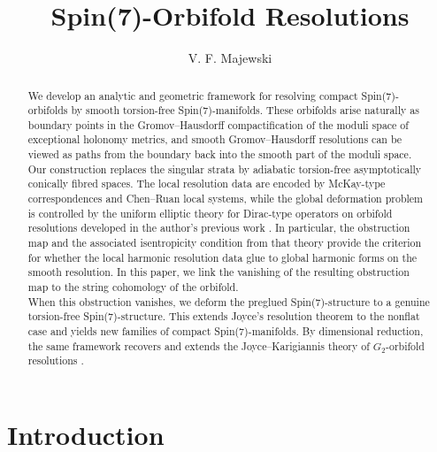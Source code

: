 \documentclass[psamsfonts]{amsart}
\title{Spin(7)-Orbifold Resolutions}
\author{V. F. Majewski}
\theoremstyle{plain}
\theoremstyle{definition}{
\newtheorem{defi}{Definition}[section]
\newtheorem{ass}{Assumption}
\newtheorem*{nota}{Notation}}
\theoremstyle{remark}{
\newtheorem{rem}{Remark}
\newtheorem{ex}{Example}}
\theoremstyle{plain}{
\newtheorem{thm}{Theorem}[section]
\newtheorem{lem}{Lemma}[section]
\newtheorem{cor}{Corollary}[section]
\newtheorem{prop}{Proposition}[section]
\newtheorem{con}{Conjecture}[section]}
\begin{document}
\maketitle
\begin{abstract}
We develop an analytic and geometric framework for resolving compact Spin(7)-orbifolds by smooth torsion-free Spin(7)-manifolds. These orbifolds arise naturally as boundary points in the Gromov--Hausdorff compactification of the moduli space of exceptional
holonomy metrics, and smooth Gromov--Hausdorff resolutions can be viewed as paths from the boundary back into the smooth part of the moduli space.\\

Our construction replaces the singular strata by adiabatic torsion-free asymptotically conically fibred spaces. The local resolution data are encoded by McKay-type correspondences and Chen--Ruan local systems, while the global deformation problem is controlled by the uniform elliptic theory for Dirac-type operators on
orbifold resolutions developed in the author's previous work \cite{majewskiDirac}. In
particular, the obstruction map and the associated isentropicity condition from that theory provide the criterion for whether the local harmonic resolution data glue to global harmonic forms on the smooth
resolution. In this paper, we link the vanishing of the resulting obstruction map to the string cohomology of the orbifold.\\

When this obstruction vanishes, we deform the preglued
Spin(7)-structure to a genuine torsion-free Spin(7)-structure. This extends Joyce's resolution theorem \cite{Joyce1996b,Joyce1999} to the nonflat case and yields new families of compact Spin(7)-manifolds. By dimensional reduction, the same framework recovers and extends the Joyce--Karigiannis theory of $G_2$-orbifold resolutions
\cite{joyce2017new}.
\end{abstract}



\tableofcontents


\section{Introduction}
\label{Introduction}
\end{document}
